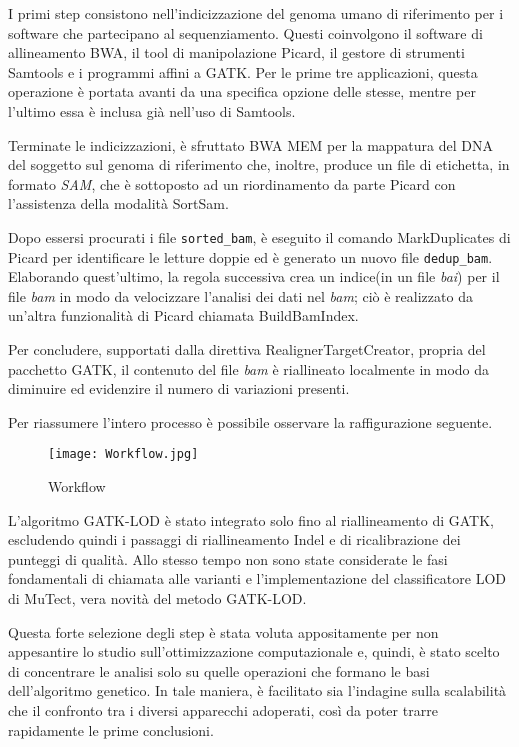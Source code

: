I primi step consistono nell'indicizzazione del genoma umano di riferimento per i software che partecipano al sequenziamento.
Questi coinvolgono il software di allineamento BWA, il tool di manipolazione Picard, il gestore di strumenti Samtools e i programmi affini a GATK.
 Per le prime tre  applicazioni, questa operazione è portata avanti da una specifica opzione delle stesse, mentre per l'ultimo essa è inclusa già nell'uso di Samtools.

Terminate le indicizzazioni, è sfruttato BWA MEM per la mappatura del DNA del soggetto sul genoma di riferimento che, inoltre, produce un file di etichetta, in formato \textit{SAM}, che è sottoposto ad un riordinamento da parte Picard con l'assistenza della modalità SortSam.

Dopo essersi procurati i file \verb!sorted_bam!, è eseguito il comando MarkDuplicates di Picard per identificare le letture doppie ed è generato un nuovo file \verb!dedup_bam!.
Elaborando quest'ultimo, la regola successiva crea un indice(in un file \textit{bai}) per il file \textit{bam} in modo da velocizzare l'analisi dei dati nel \textit{bam}; ciò è realizzato da un'altra funzionalità di Picard chiamata BuildBamIndex.

Per concludere, supportati dalla direttiva RealignerTargetCreator, propria del pacchetto GATK, il contenuto del file \textit{bam} è riallineato localmente in modo da diminuire ed evidenzire il numero di variazioni presenti.

Per riassumere l'intero processo è possibile osservare la raffigurazione seguente.
\begin{figure}[H]
\centering
\texttt{[image: Workflow.jpg]}
\caption{Workflow}
\label{fig:workflow}
\end{figure}
L'algoritmo GATK-LOD è stato integrato solo fino al riallineamento di GATK, escludendo quindi i passaggi di riallineamento Indel e di ricalibrazione dei punteggi di qualità.
Allo stesso tempo non sono state considerate le fasi fondamentali di chiamata alle varianti e l'implementazione del classificatore LOD di MuTect, vera novità del metodo GATK-LOD.

Questa forte selezione degli step è stata voluta appositamente per non appesantire lo studio sull'ottimizzazione computazionale e, quindi, è stato scelto di concentrare le analisi solo su quelle operazioni che formano le basi dell'algoritmo genetico.
In tale maniera, è facilitato sia l'indagine sulla scalabilità che il confronto tra i diversi apparecchi adoperati, così da poter trarre rapidamente le prime conclusioni.



